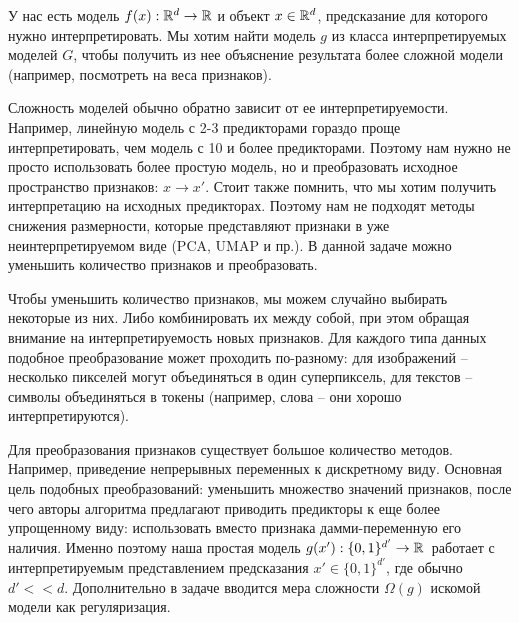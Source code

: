 У нас есть модель $f(x): \mathbb{R}^d \rightarrow \mathbb{R}$ и объект $x \in \mathbb{R}^d$, предсказание для которого нужно интерпретировать. Мы хотим найти модель $g$ из класса интерпретируемых моделей $G$, чтобы получить из нее объяснение результата более сложной модели (например, посмотреть на веса признаков).

Сложность моделей обычно обратно зависит от ее интерпретируемости. Например, линейную модель с 2-3 предикторами гораздо проще интерпретировать, чем модель с 10 и более предикторами. Поэтому нам нужно не просто использовать более простую модель, но и преобразовать исходное пространство признаков: $x \rightarrow x'$. Стоит также помнить, что мы хотим получить интерпретацию на исходных предикторах. Поэтому нам не подходят методы снижения размерности, которые представляют признаки в уже неинтерпретируемом виде (PCA, UMAP и пр.). В данной задаче можно уменьшить количество признаков и преобразовать.

Чтобы уменьшить количество признаков, мы можем случайно выбирать некоторые из них. Либо комбинировать их между собой, при этом обращая внимание на интерпретируемость новых признаков. Для каждого типа данных подобное преобразование может проходить по-разному: для изображений -- несколько пикселей могут объединяться в один суперпиксель, для текстов -- символы объединяться в токены (например, слова -- они хорошо интерпретируются).

Для преобразования признаков существует большое количество методов. Например, приведение непрерывных переменных к дискретному виду. Основная цель подобных преобразований: уменьшить множество значений признаков, после чего авторы алгоритма предлагают приводить предикторы к еще более упрощенному виду: использовать вместо признака дамми-переменную его наличия. Именно поэтому наша простая модель $g(x'):\{0,1\}^{d'} \rightarrow \mathbb{R}\,$ работает с интерпретируемым представлением предсказания $x' \in \{0,1\}^{d'}$, где обычно $d' << d$.
Дополнительно в задаче вводится мера сложности $\Omega(g)$ искомой модели как регуляризация. %

